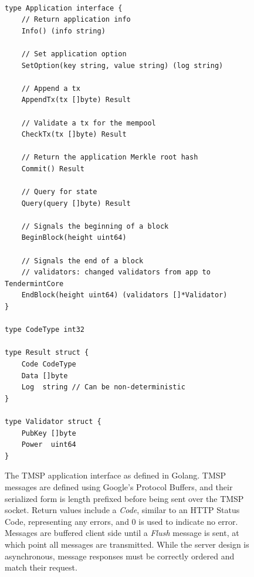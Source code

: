 \begin{figure}[]
\vspace*{-1.5in}
    	\centering
\begin{verbatim}

type Application interface {
	// Return application info
	Info() (info string)

	// Set application option
	SetOption(key string, value string) (log string)

	// Append a tx
	AppendTx(tx []byte) Result

	// Validate a tx for the mempool
	CheckTx(tx []byte) Result

	// Return the application Merkle root hash
	Commit() Result

	// Query for state
	Query(query []byte) Result

	// Signals the beginning of a block
	BeginBlock(height uint64) 

	// Signals the end of a block
	// validators: changed validators from app to TendermintCore
	EndBlock(height uint64) (validators []*Validator)
}

type CodeType int32

type Result struct {
	Code CodeType
	Data []byte
	Log  string // Can be non-deterministic
}

type Validator struct {
	PubKey []byte 
	Power  uint64 
}
\end{verbatim}
	\label{fig:tmsp_msgs}
	\caption[TMSP Message Types]{
The TMSP application interface as defined in Golang.
TMSP messages are defined using Google's Protocol Buffers, and their serialized form is length prefixed before 
being sent over the TMSP socket. 
Return values include a \emph{Code}, similar to an HTTP Status Code, representing any errors,
and $0$ is used to indicate no error.
Messages are buffered client side until a \emph{Flush} message is sent,
at which point all messages are transmitted. While the server design is asynchronous, message responses must be correctly ordered and match their request.
}
\end{figure}


